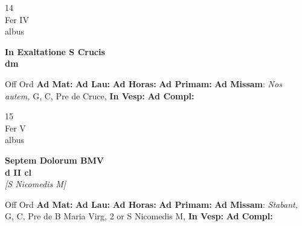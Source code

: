 \documentclass[10pt, openany]{book}
\begin{document}
    \begin{center}
        \begin{minipage}{3.5in}
            \vspace{2em}
            \begin{minipage}{0.5in}
                {\Huge 14} \\
                {\normalsize Fer IV} \\
                {\normalsize albus}
            \end{minipage}
            \begin{minipage}{3.0in}
                \textbf{ \large In Exaltatione S Crucis \\
                \textnormal{\normalsize dm}} \\ 
            \end{minipage}
            \begin{justify}Off Ord
                \textbf{Ad Mat: }
                \textbf{Ad Lau: }
                \textbf{Ad Horas: }
                \textbf{Ad Primam: }\textbf{Ad Missam}: \textit{Nos autem,} G, C, Pre de Cruce,  
                \textbf{In Vesp: }
                \textbf{Ad Compl: }
            \end{justify}
        \end{minipage}
    \end{center}

    \begin{center}
        \begin{minipage}{3.5in}
            \vspace{2em}
            \begin{minipage}{0.5in}
                {\Huge 15} \\
                {\normalsize Fer V} \\
                {\normalsize albus}
            \end{minipage}
            \begin{minipage}{3.0in}
                \textbf{ \large Septem Dolorum BMV \\
                \textnormal{\normalsize d II cl}} \\ \textit{[S Nicomedis M]} \\ 
            \end{minipage}
            \begin{justify}Off Ord
                \textbf{Ad Mat: }
                \textbf{Ad Lau: }
                \textbf{Ad Horas: }
                \textbf{Ad Primam: }\textbf{Ad Missam}: \textit{Stabant,} G, C, Pre de B Maria Virg, 2 or S Nicomedis M,  
                \textbf{In Vesp: }
                \textbf{Ad Compl: }
            \end{justify}
        \end{minipage}
    \end{center}
\end{document}
